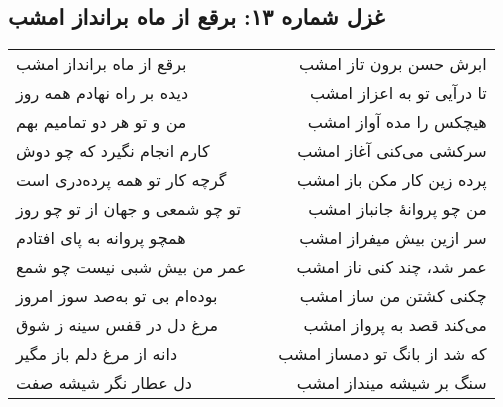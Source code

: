 \begin{center}
\section*{غزل شماره ۱۳: برقع از ماه برانداز امشب}
\label{sec:013}
\begin{longtable}{l p{0.5cm} r}
برقع از ماه برانداز امشب
&&
ابرش حسن برون تاز امشب
\\
دیده بر راه نهادم همه روز
&&
تا درآیی تو به اعزاز امشب
\\
من و تو هر دو تمامیم بهم
&&
هیچکس را مده آواز امشب
\\
کارم انجام نگیرد که چو دوش
&&
سرکشی می‌کنی آغاز امشب
\\
گرچه کار تو همه پرده‌دری است
&&
پرده زین کار مکن باز امشب
\\
تو چو شمعی و جهان از تو چو روز
&&
من چو پروانهٔ جانباز امشب
\\
همچو پروانه به پای افتادم
&&
سر ازین بیش میفراز امشب
\\
عمر من بیش شبی نیست چو شمع
&&
عمر شد، چند کنی ناز امشب
\\
بوده‌ام بی تو به‌صد سوز امروز
&&
چکنی کشتن من ساز امشب
\\
مرغ دل در قفس سینه ز شوق
&&
می‌کند قصد به پرواز امشب
\\
دانه از مرغ دلم باز مگیر
&&
که شد از بانگ تو دمساز امشب
\\
دل عطار نگر شیشه صفت
&&
سنگ بر شیشه مینداز امشب
\\
\end{longtable}
\end{center}
